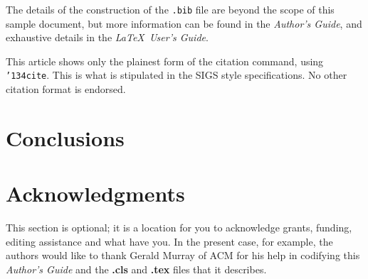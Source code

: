 \documentclass{edm_article}
\begin{document}
The details of the construction of the \texttt{.bib} file
are beyond the scope of this sample document, but more
information can be found in the \textit{Author's Guide},
and exhaustive details in the \textit{\LaTeX\ User's
Guide}\cite{Lamport:LaTeX}.

This article shows only the plainest form
of the citation command, using \texttt{{\char'134}cite}.
This is what is stipulated in the SIGS style specifications.
No other citation format is endorsed.



\section{Conclusions}

\section{Acknowledgments}
This section is optional; it is a location for you
to acknowledge grants, funding, editing assistance and
what have you.  In the present case, for example, the
authors would like to thank Gerald Murray of ACM for
his help in codifying this \textit{Author's Guide}
and the \textbf{.cls} and \textbf{.tex} files that it describes.

%

\end{document}
